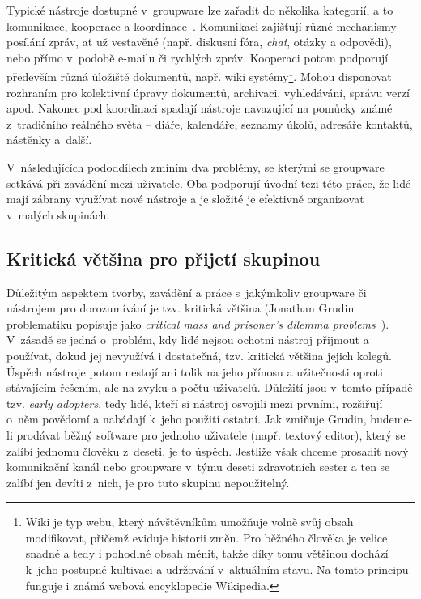 \documentclass[12pt,oneside,final]{fithesis2}
\begin{document}
Typické nástroje dostupné v~groupware lze zařadit do několika kategorií, a to komunikace, kooperace a koordinace~\cite{kunstova1999skupinova}. Komunikaci zajišťují různé mechanismy posílání zpráv, ať už vestavěné (např. diskusní fóra, \emph{chat}, otázky a odpovědi), nebo přímo v~podobě e-mailu či rychlých zpráv. Kooperaci potom podporují především různá úložiště dokumentů, např. wiki systémy\footnote{Wiki je typ webu, který návštěvníkům umožňuje volně svůj obsah modifikovat, přičemž eviduje historii změn. Pro běžného člověka je velice snadné a tedy i pohodlné obsah měnit, takže díky tomu většinou dochází k~jeho postupné kultivaci a udržování v~aktuálním stavu. Na tomto principu funguje i známá webová encyklopedie Wikipedia.}. Mohou disponovat rozhraním pro kolektivní úpravy dokumentů, archivaci, vyhledávání, správu verzí apod. Nakonec pod koordinaci spadají nástroje navazující na pomůcky známé z~tradičního reálného světa -- diáře, kalendáře, seznamy úkolů, adresáře kontaktů, nástěnky a~další.

V~následujících pododdílech zmíním dva problémy, se kterými se groupware setkává při zavádění mezi uživatele. Oba podporují úvodní tezi této práce, že lidé mají zábrany využívat nové nástroje a je složité je efektivně organizovat v~malých skupinách.

\subsection{Kritická většina pro přijetí skupinou}\label{criticalMass}
Důležitým aspektem tvorby, zavádění a práce s~jakýmkoliv groupware či nástrojem pro dorozumívání je tzv. kritická většina (Jonathan Grudin problematiku popisuje jako \emph{critical mass and prisoner's dilemma problems}~\cite{grudin1994groupware}). V~zásadě se jedná o~problém, kdy lidé nejsou ochotni nástroj přijmout a používat, dokud jej nevyužívá i dostatečná, tzv. kritická většina jejich kolegů. Úspěch nástroje potom nestojí ani tolik na jeho přínosu a užitečnosti oproti stávajícím řešením, ale na zvyku a počtu uživatelů. Důležití jsou v~tomto případě tzv. \emph{early adopters}, tedy lidé, kteří si nástroj osvojili mezi prvními, rozšiřují o~něm povědomí a nabádají k~jeho použití ostatní. Jak zmiňuje Grudin, budeme-li prodávat běžný software pro jednoho uživatele (např. textový editor), který se zalíbí jednomu člověku z~deseti, je to úspěch. Jestliže však chceme prosadit nový komunikační kanál nebo groupware v~týmu deseti zdravotních sester a ten se zalíbí jen devíti z~nich, je pro tuto skupinu nepoužitelný.
\end{document}
